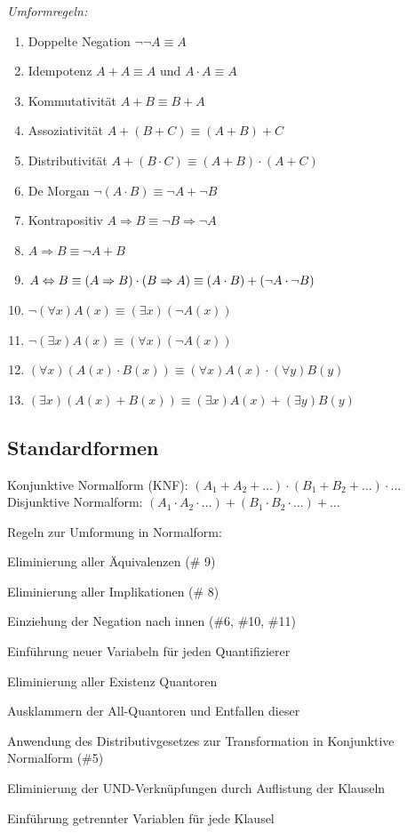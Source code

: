 \documentclass[german,color,6pt]{latex4ei/latex4ei_sheet}
\begin{document}
\begin{emphbox}
\emph{Umformregeln:}
\begin{enumerate}
	\item Doppelte Negation $\neg \neg A \equiv A$
	\item Idempotenz $ A + A \equiv A$ und $ A \cdot A \equiv A$
	\item Kommutativität $A + B \equiv B + A$
	\item Assoziativität $A + (B + C) \equiv (A + B) + C$
	\item Distributivität $A + (B \cdot C) \equiv (A + B) \cdot (A + C)$
	\item De Morgan $\neg(A \cdot B) \equiv \neg A + \neg B$
	\item Kontrapositiv $A \Rightarrow B \equiv \neg B \Rightarrow \neg A$
	\item $ A \Rightarrow B \equiv \neg A + B$
	\item $ A \Leftrightarrow B \equiv (A \Rightarrow B ) \cdot (B \Rightarrow A) \equiv (A \cdot B) + (\neg A \cdot \neg B) $
	\item $ \neg (\forall x)A(x) \equiv (\exists x)(\neg A(x))$
	\item $ \neg (\exists x) A(x) \equiv (\forall x) (\neg{}A(x)) $
	\item $ (\forall x)(A(x) \cdot B(x)) \equiv (\forall x)A(x) \cdot (\forall y )B(y)$
	\item $ (\exists x)(A(x) + B(x)) \equiv (\exists x)A(x) + (\exists y)B(y)$
\end{enumerate}
\end{emphbox}

\begin{sectionbox}
\subsection{Standardformen}
Konjunktive Normalform (KNF): $(A_1 + A_2 + \dots) \cdot (B_1 + B_2 + \dots) \cdot \dots$ \\
Disjunktive Normalform: $(A_1 \cdot A_2 \cdot \dots) + (B_1 \cdot B_2 \cdot \dots) + \dots$
\begin{cookbox}{Regeln zur Umformung in Normalform:}
	\item Eliminierung aller Äquivalenzen (\# 9)
	\item Eliminierung aller Implikationen (\# 8)
	\item Einziehung der Negation nach innen (\#6, \#10, \#11)
	\item Einführung neuer Variabeln für jeden Quantifizierer
	\item Eliminierung aller Existenz Quantoren
	\item Ausklammern der All-Quantoren und Entfallen dieser
	\item Anwendung des Distributivgesetzes zur Transformation in Konjunktive Normalform (\#5)
	\item Eliminierung der UND-Verknüpfungen durch Auflistung der Klauseln
	\item Einführung getrennter Variablen für jede Klausel
\end{cookbox}
\end{sectionbox}
\end{document}
